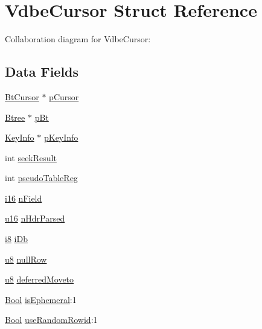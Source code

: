\hypertarget{struct_vdbe_cursor}{}\section{Vdbe\+Cursor Struct Reference}
\label{struct_vdbe_cursor}


Collaboration diagram for Vdbe\+Cursor\+:
\subsection*{Data Fields}
\begin{DoxyCompactItemize}
\item 
\hyperlink{struct_bt_cursor}{Bt\+Cursor} $\ast$ \hyperlink{struct_vdbe_cursor_a3719d9ea75c17cb66e4f628b8a4bd106}{p\+Cursor}
\item 
\hyperlink{struct_btree}{Btree} $\ast$ \hyperlink{struct_vdbe_cursor_aea9f10c5940febc27e109d5ec9f9d2af}{p\+Bt}
\item 
\hyperlink{struct_key_info}{Key\+Info} $\ast$ \hyperlink{struct_vdbe_cursor_a2394c1e8402fe40753205256757b4165}{p\+Key\+Info}
\item 
int \hyperlink{struct_vdbe_cursor_ad4a00b8dd3dc55901a7d9f7dc6b54794}{seek\+Result}
\item 
int \hyperlink{struct_vdbe_cursor_a2db26c350377e5259405e33aceae08fe}{pseudo\+Table\+Reg}
\item 
\hyperlink{sqlite3_8c_a7b32340f65cd15f029caad258fb3355c}{i16} \hyperlink{struct_vdbe_cursor_a1755ad239f6e44f3faeb8126792fb5be}{n\+Field}
\item 
\hyperlink{sqlite3_8c_a20f2299e322dcbde37cb07b16910b843}{u16} \hyperlink{struct_vdbe_cursor_a852275cc9d48313d2fd65595c065cb74}{n\+Hdr\+Parsed}
\item 
\hyperlink{sqlite3_8c_ad11a1324ecade336dc6ce17a20cf6617}{i8} \hyperlink{struct_vdbe_cursor_adb4fd692ce3625fae80bc89f71c57a2b}{i\+Db}
\item 
\hyperlink{sqlite3_8c_a74a0f6424ae628af25f23f0a35f6ead3}{u8} \hyperlink{struct_vdbe_cursor_a9997cf9a46ae166a735425897193bfb0}{null\+Row}
\item 
\hyperlink{sqlite3_8c_a74a0f6424ae628af25f23f0a35f6ead3}{u8} \hyperlink{struct_vdbe_cursor_a7b03e9d9280dae6d4184ebf86a6a557e}{deferred\+Moveto}
\item 
\hyperlink{sqlite3_8c_a2f520588d7cfd47c237231e103dbeb78}{Bool} \hyperlink{struct_vdbe_cursor_a53dd61c651247c5df3d3a1f701032a0b}{is\+Ephemeral}\+:1
\item 
\hyperlink{sqlite3_8c_a2f520588d7cfd47c237231e103dbeb78}{Bool} \hyperlink{struct_vdbe_cursor_aa1fa2ce0c85923d79e8a119d949722a7}{use\+Random\+Rowid}\+:1

\end{DoxyCompactItemize}
